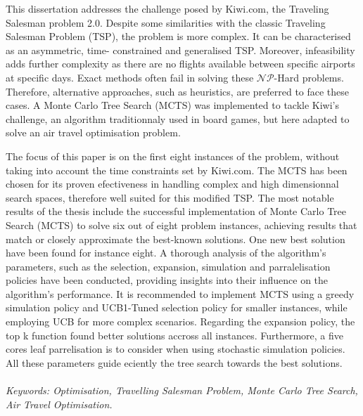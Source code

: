 

This dissertation addresses the challenge posed by Kiwi.com, the Traveling Salesman problem 2.0. Despite some similarities with the classic Traveling Salesman Problem
(TSP), the problem is more complex. It can be characterised as an asymmetric, time-
constrained and generalised TSP. Moreover, infeasibility adds further complexity as
there are no ﬂights available between speciﬁc airports at speciﬁc days. Exact methods
often fail in solving these $\mathcal{NP}$-Hard problems. Therefore, alternative approaches, such
as heuristics, are preferred to face these cases. A Monte Carlo Tree Search (MCTS)
was implemented to tackle Kiwi’s challenge, an algorithm traditionnaly used in board
games, but here adapted to solve an air travel optimisation problem.

The focus of this paper is on the first eight instances of the problem, without taking into
account the time constraints set by Kiwi.com. The MCTS has been chosen for its proven
efectiveness in handling complex and high dimensionnal search spaces, therefore well
suited for this modified TSP. The most notable results of the thesis include the successful
implementation of Monte Carlo Tree Search (MCTS) to solve six out of eight problem
instances, achieving results that match or closely approximate the best-known solutions.
One new best solution have been found for instance eight. A thorough analysis of the
algorithm’s parameters, such as the selection, expansion, simulation and parralelisation
policies have been conducted, providing insights into their influence on the algorithm’s
performance. It is recommended to implement MCTS using a greedy simulation policy
and UCB1-Tuned selection policy for smaller instances, while employing UCB for more
complex scenarios. Regarding the expansion policy, the top k function found better
solutions accross all instances. Furthermore, a five cores leaf parrelisation is to consider
when using stochastic simulation policies. All these parameters guide eciently the tree
search towards the best solutions.
\\
\\
\textit{Keywords: Optimisation, Travelling Salesman Problem, Monte Carlo Tree Search, Air
Travel Optimisation.}

\clearpage

